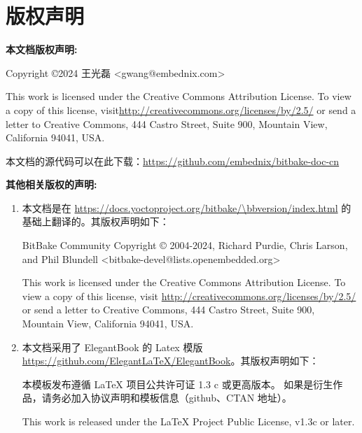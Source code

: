 % 
% 
% 

\chapter*{版权声明}

\textbf{本文档版权声明:}

Copyright \copyright 2024 王光磊 <gwang@embednix.com>

This work is licensed under the Creative Commons Attribution License. To view a copy of this license, visit\linebreak \url{http://creativecommons.org/licenses/by/2.5/} or send a letter to Creative Commons, 444 Castro Street, Suite 900, Mountain View, California 94041, USA.

本文档的源代码可以在此下载：\url{https://github.com/embednix/bitbake-doc-cn}


\textbf{其他相关版权的声明:}

\begin{enumerate}    
\item 本文档是在 \url{https://docs.yoctoproject.org/bitbake/\bbversion/index.html} 的基础上翻译的。其版权声明如下：

\medskip
BitBake Community
Copyright © 2004-2024, Richard Purdie, Chris Larson, and Phil Blundell\linebreak
<bitbake-devel@lists.openembedded.org>

\medskip
This work is licensed under the Creative Commons Attribution License. To view a copy of this license, visit \linebreak \url{http://creativecommons.org/licenses/by/2.5/} or send a letter to Creative Commons, 444 Castro Street, Suite 900, Mountain View, California 94041, USA.

\medskip
\item 本文档采用了 ElegantBook 的 Latex 模版 \url{https://github.com/ElegantLaTeX/ElegantBook}。其版权声明如下：

\medskip
本模板发布遵循 LaTeX 项目公共许可证 1.3 c 或更高版本。 如果是衍生作品，请务必加入协议声明和模板信息（github、CTAN 地址）。

\medskip
This work is released under the LaTeX Project Public License, v1.3c or later.
\end{enumerate}


